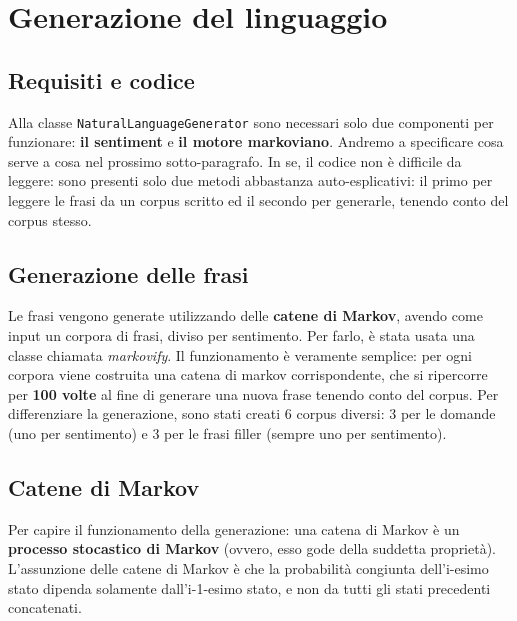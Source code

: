 \section{Generazione del linguaggio}
\subsection{Requisiti e codice}
Alla classe \texttt{NaturalLanguageGenerator} sono necessari solo due componenti per funzionare: \textbf{il sentiment} e \textbf{il motore markoviano}. Andremo a specificare cosa serve a cosa nel prossimo sotto-paragrafo.
In se, il codice non è difficile da leggere: sono presenti solo due metodi abbastanza auto-esplicativi: il primo per leggere le frasi da un corpus scritto ed il secondo per generarle, tenendo conto del corpus stesso.

\subsection{Generazione delle frasi}
Le frasi vengono generate utilizzando delle \textbf{catene di Markov}, avendo come input un corpora di frasi, diviso per sentimento. Per farlo, è stata usata una classe chiamata \textit{markovify}. Il funzionamento è veramente semplice: per ogni corpora viene costruita una catena di markov corrispondente, che si ripercorre per \textbf{100 volte} al fine di generare una nuova frase tenendo conto del corpus. Per differenziare la generazione, sono stati creati 6 corpus diversi: 3 per le domande (uno per sentimento) e 3 per le frasi filler (sempre uno per sentimento).

\subsection{Catene di Markov}
Per capire il funzionamento della generazione: una catena di Markov è un \textbf{processo stocastico di Markov} (ovvero, esso gode della suddetta proprietà). L'assunzione delle catene di Markov è che la probabilità congiunta dell'i-esimo stato dipenda solamente dall'i-1-esimo stato, e non da tutti gli stati precedenti concatenati.


